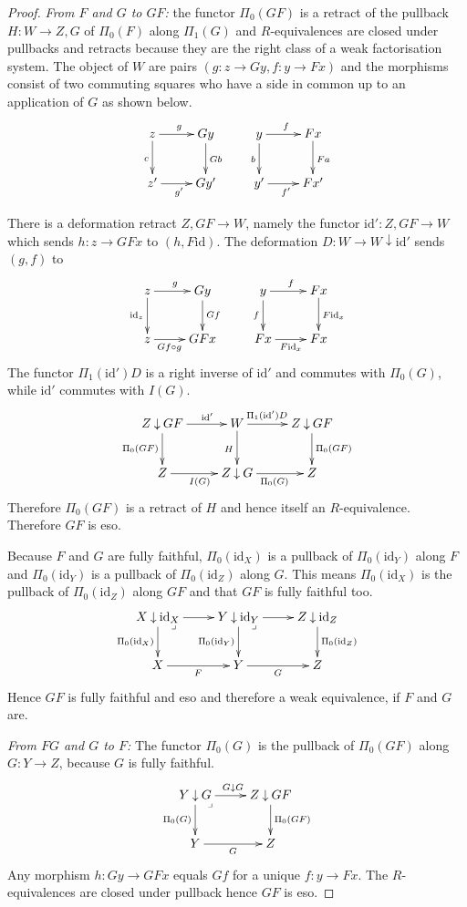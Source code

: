\documentclass{amsart}
\theoremstyle{plain}
\theoremstyle{definition}
\newcommand\id{\mathrm{id}}
\begin{document}
\begin{proof} \emph{From $F$ and $G$ to $GF$:} the functor $\Pi_0(GF)$ is a retract of the pullback $H:W\to Z\comma G$ of $\Pi_0(F)$ along $\Pi_1(G)$ and $R$-equivalences are closed under pullbacks and retracts because they are the right class of a weak factorisation system. The object of $W$ are pairs $(g:z\to Gy,f:y\to Fx)$ and the morphisms consist of two commuting squares who have a side in common up to an application of $G$ as shown below.
\[ \xymatrix{
z\ar[d]_c\ar[r]^g & Gy\ar[d]^{Gb} & y\ar[d]_b\ar[r]^f & Fx\ar[d]^{Fa} \\
z'\ar[r]_{g'} & Gy' & y'\ar[r]_{f'} & Fx'
}\]

There is a deformation retract $Z\comma GF \to W$, namely the functor $\id':Z\comma GF\to W$ which sends $h:z\to GFx$ to $(h, F\id)$. The deformation $D:W\to W\downarrow\id'$ sends $(g,f)$ to
\[ \xymatrix{
z\ar[d]_{\id_z}\ar[r]^g & Gy\ar[d]^{Gf} & y\ar[d]_f\ar[r]^f & Fx\ar[d]^{F\id_x} \\
z\ar[r]_(.4){Gf\circ g} & GFx & Fx\ar[r]_{F\id_x} & Fx
}\]
The functor $\Pi_1(\id')D$ is a right inverse of $\id'$ and commutes with $\Pi_0(G)$, while $\id'$ commutes with $I(G)$.
\[ \xymatrix{
Z\comma GF \ar[r]^(.6){\id'}\ar[d]_{\Pi_0(GF)} & W \ar[r]^(.4){\Pi_1(\id')D}\ar[d]_H & Z\comma GF\ar[d]^{\Pi_0(GF)} \\
Z \ar[r]_{I(G)} & Z\comma G \ar[r]_{\Pi_0(G)} & Z 
}\]
Therefore $\Pi_0(GF)$ is a retract of $H$ and hence itself an $R$-equivalence. Therefore $GF$ is eso.

Because $F$ and $G$ are fully faithful, $\Pi_0(\id_X)$ is a pullback of $\Pi_0(\id_Y)$ along $F$ and $\Pi_0(\id_Y)$ is a pullback of $\Pi_0(\id_Z)$ along $G$. This means $\Pi_0(\id_X)$ is the pullback of $\Pi_0(\id_Z)$ along $GF$ and that $GF$ is fully faithful too. 
\[ \xymatrix{
X\comma\id_X\ar[d]_{\Pi_0(\id_X)}\ar[r]\ar@{}[dr]|<\lrcorner&Y\ar[r]\comma\id_Y\ar[d]_{\Pi_0(\id_Y)}\ar@{}[dr]|<\lrcorner&Z\comma\id_Z\ar[d]^{\Pi_0(\id_Z)}\\
X\ar[r]_F & Y\ar[r]_G & Z
}\]
Hence $GF$ is fully faithful and eso and therefore a weak equivalence, if $F$ and $G$ are.

\emph{From $FG$ and $G$ to $F$:} The functor $\Pi_0(G)$ is the pullback of $\Pi_0(GF)$ along $G:Y\to Z$, because $G$ is fully faithful.
\[ \xymatrix{
Y\comma G \ar[d]_{\Pi_0(G)} \ar[r]^{G\comma G} \ar@{}[dr]|<\lrcorner & Z\comma GF\ar[d]^{\Pi_0(GF)} \\
Y \ar[r]_G & Z
}\]
Any morphism $h:Gy \to GFx$ equals $Gf$ for a unique $f:y\to Fx$. The $R$-equivalences are closed under pullback hence $GF$ is eso.


\end{proof}
\end{document}
